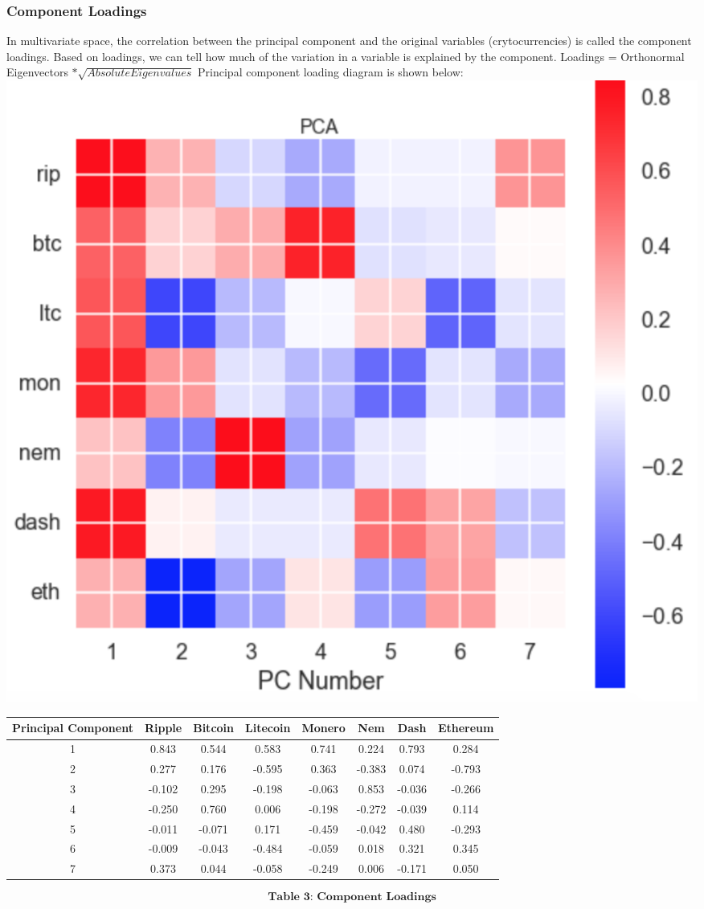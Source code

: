 \documentclass[12pt,twoside]{article}
\newcommand{\head}[1]{\textnormal{\textbf{#1}}}
\begin{document}
\subsubsection*{Component Loadings}
\bigbreak
In multivariate space, the correlation between the principal component and the original variables (crytocurrencies) is called the component loadings. Based on loadings, we can tell how much of the variation in a variable is explained by the component.
\bigbreak
Loadings = Orthonormal Eigenvectors $* \sqrt{Absolute Eigen values}$
\bigbreak
Principal component loading diagram is shown below:
\bigbreak
\includegraphics[scale=.6]{pca_loadings.png}
\bigbreak
\begin{tabular}{cccccccc}
\hline
\head{Principal \newline Component} & \head{Ripple} & \head{Bitcoin} & \head{Litecoin} &\head{Monero} &\head{Nem} &\head{Dash} &\head{Ethereum}\\
\hline
1 & 0.843&0.544&0.583&0.741&0.224&0.793&0.284\\
2 & 0.277&0.176&-0.595&0.363&-0.383&0.074	&-0.793\\
3 & -0.102	&0.295&-0.198&-0.063&0.853&-0.036&-0.266\\
4 & -0.250&0.760&0.006&-0.198&-0.272&-0.039&0.114\\
5 & -0.011	&-0.071&0.171&-0.459&-0.042&0.480&-0.293\\
6 & -0.009&-0.043&-0.484&-0.059&0.018&0.321&0.345\\
7 & 0.373&0.044&-0.058&-0.249&0.006&-0.171&0.050\\
\hline
\end{tabular}
$$\textbf{Table 3: Component Loadings}$$
\end{document}
